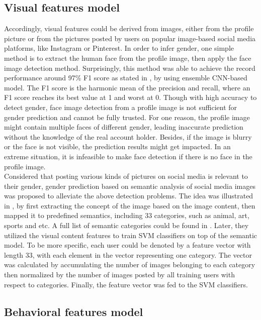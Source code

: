 \documentclass[runningheads]{llncs}
\begin{document}
	
	\subsection{Visual features model}
	
	Accordingly, visual features could be derived from images, either from the profile picture or from the pictures posted by users on popular image-based social media platforms, like Instagram or Pinterest. In order to infer gender, one simple method is to extract the human face from the profile image, then apply the face image detection method. Surprisingly, this method was able to achieve the record performance around 97\% F1 score as stated in \cite{antipov2016minimalistic}, by using ensemble CNN-based model. The F1 score is the harmonic mean of the precision and recall, where an F1 score reaches its best value at 1 and worst at 0. Though with high accuracy to detect gender, face image detection from a profile image is not sufficient for gender prediction and cannot be fully trusted. For one reason, the profile image might contain multiple faces of different gender, leading inaccurate prediction without the knowledge of the real account holder. Besides, if the image is blurry or the face is not visible, the prediction results might get impacted. In an extreme situation,  it is infeasible to make face detection if there is no face in the profile image. \\
	
	Considered that posting various kinds of pictures on social media is relevant to their gender, gender prediction based on semantic analysis of social media images was proposed to alleviate the above detection problems. The idea was illustrated in \cite{you2014eyes}, by first extracting the concept of the image based on the image content, then mapped it to predefined semantics, including 33 categories, such as animal, art, sports and etc. A full list of semantic categories could be found in \cite{you2014eyes}. Later, they utilized the visual content features to train SVM classifiers on top of the semantic model. To be more specific, each user could be denoted by a feature vector with length 33, with each element in the vector representing one category. The vector was calculated by accumulating the number of images belonging to each category then normalized by the number of images posted by all training users with respect to categories. Finally, the feature vector was fed to the SVM classifiers. \\
	
	
	\subsection{Behavioral features model}
	
\end{document}
